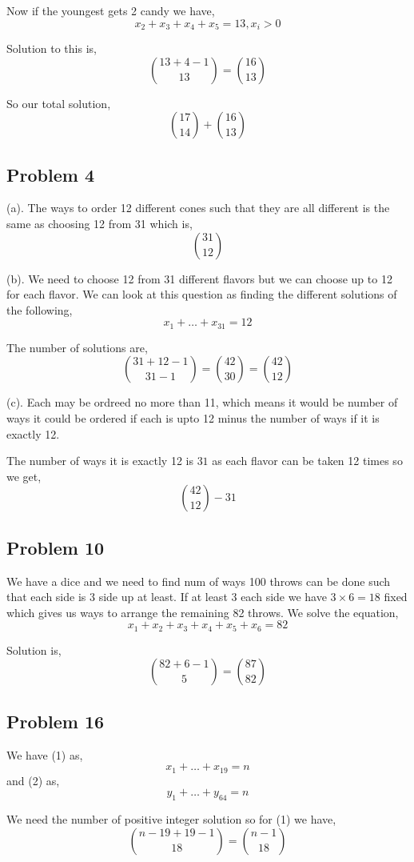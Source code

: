 \documentclass[a4paper]{report}
\begin{document}
Now if the youngest gets 2 candy we have, 
$$ x_2 + x_3 + x_4 + x_5 = 13, x_i > 0 $$ 

Solution to this is, 
$$ {13 + 4 - 1 \choose 13} = {16 \choose 13} $$ 

So our total solution, 
$$ {17 \choose 14} + {16 \choose 13} $$ 


\subsection*{Problem 4}
(a). 
The ways to order 12 different cones such that they are all different is the same as choosing 12 from 31 which is, 
$$ 31 \choose 12 $$ 

(b). We need to choose 12 from 31 different flavors but we can choose up to 12 for each flavor. We can look at this question as finding the different solutions of the following,
$$ x_1 + \dots + x_{31} = 12 $$ 

The number of solutions are, 
$$  {31 + 12 - 1 \choose 31 - 1} = {42 \choose 30 } = {42 \choose 12}$$ 


(c). Each may be ordreed no more than 11, which means it would be number of ways it could be ordered if each is upto 12 minus the number of ways if it is exactly 12.

The number of ways it is exactly 12 is $31$ as each flavor can be taken 12 times so we get,  
$$ {42 \choose 12} - 31 $$ 



\subsection*{Problem 10}
We have a dice and we need to find num of ways 100 throws can be done such that each side is 3 side up at least. If at least 3 each side we have $3\times 6 = 18$ fixed which gives us ways to arrange the remaining 82 throws. We solve the equation, 
$$ x_1 + x_2 + x_3 + x_4 + x_5  + x_6 = 82 $$ 

Solution is, 
$$ {82 + 6 - 1 \choose 5} = {87 \choose 82} $$ 



\subsection*{Problem 16}
We have (1) as, 
$$ x_1 + \dots + x_{19} = n $$  and (2) as, 
$$ y_1 + \dots + y_{64} =n $$ 


We need the number of positive integer solution so for (1) we have, 
$$ {n - 19 + 19 - 1 \choose 18} = {n - 1 \choose 18} $$ 
\end{document}
